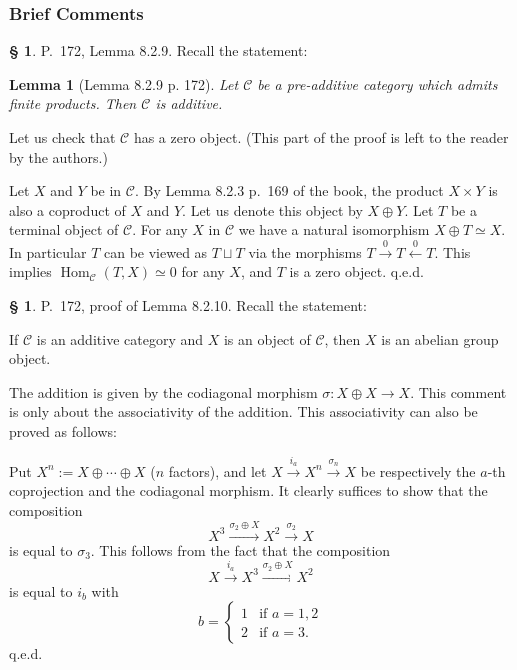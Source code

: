 \documentclass[12pt]{article}
\newtheorem{lem}[thm]{Lemma}
\theoremstyle{remark}
\theoremstyle{definition}
\newtheorem{s}[thm]{\S}
\newcommand{\C}{\mathcal C}
\newcommand{\xl}{\xleftarrow}
\newcommand{\xr}{\xrightarrow}
\DeclareMathOperator{\Hom}{Hom}
\begin{document}

\subsubsection{Brief Comments}

\begin{s} 
P.~172, Lemma 8.2.9. Recall the statement:

\begin{lem}[Lemma 8.2.9 p. 172] 
Let $\C$ be a pre-additive category which admits finite products. Then $\C$ is additive.
\end{lem}

Let us check that $\C$ has a zero object. (This part of the proof is left to the reader by the authors.) 

Let $X$ and $Y$ be in $\C$. By Lemma 8.2.3 p.~169 of the book, the product $X\times Y$ is also a coproduct of $X$ and $Y$. Let us denote this object by $X\oplus Y$. Let $T$ be a terminal object of $\C$. For any $X$ in $\C$ we have a natural isomorphism $X\oplus T\simeq X$. In particular $T$ can be viewed as $T\sqcup T$ via the morphisms $T\xr0T\xl0T$. This implies $\Hom_\C(T,X)\simeq0$ for any $X$, and $T$ is a zero object. q.e.d.
\end{s}

%

\begin{s} 
P.~172, proof of Lemma 8.2.10. Recall the statement: 

If $\C$ is an additive category and $X$ is an object of $\C$, then $X$ is an abelian group object. 

The addition is given by the codiagonal morphism $\sigma:X\oplus X\to X$. This comment is only about the associativity of the addition. This associativity can also be proved as follows:

Put $X^n:=X\oplus\cdots\oplus X$ ($n$ factors), and let $X\xr{i_a}X^n\xr{\sigma_n}X$ be respectively the $a$-th coprojection and the codiagonal morphism. It clearly suffices to show that the composition 
$$
X^3\xr{\sigma_2\oplus X}X^2\xr{\sigma_2}X
$$ 
is equal to $\sigma_3$. This follows from the fact that the composition 
$$
X\xr{i_a}X^3\xr{\sigma_2\oplus X}X^2
$$ 
is equal to $i_b$ with 
$$
b=\begin{cases}1&\text{if }a=1,2\\2&\text{if }a=3.\end{cases}
$$ 
q.e.d.
\end{s}

%
\end{document}
